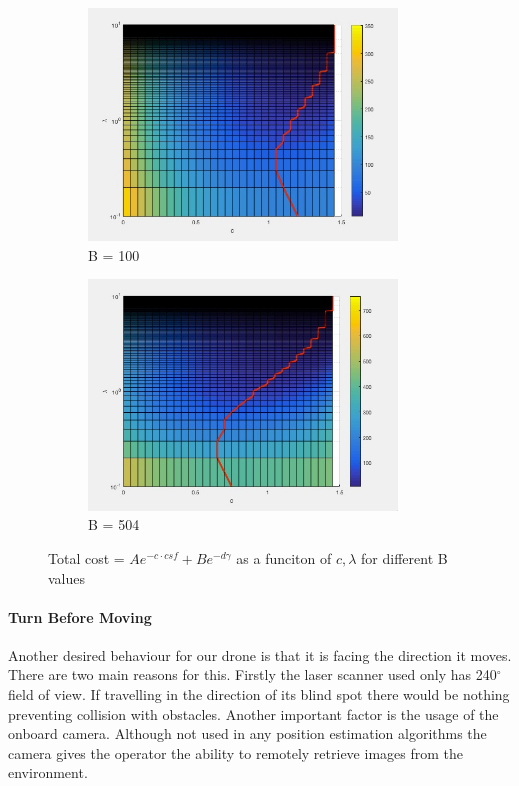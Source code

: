 \documentclass[capstone_report.tex]{subfiles}
\begin{document}
\begin{figure}[H]
    \centering
    \begin{subfigure}{0.5\textwidth}
        \centering
        \includegraphics[width=0.9\textwidth]{imgs/obstacle_vs_goal_B_100.jpg}
        \caption{B = 100}
    \end{subfigure}%
    \begin{subfigure}{0.5\textwidth}
        \centering
        \includegraphics[width=0.9\textwidth]{imgs/obstacle_vs_goal_B_504.jpg}
        \caption{B = 504}
    \end{subfigure}
    \caption{Total cost = $Ae^{-c\cdot csf} + Be^{-d\gamma}$ as a funciton of $c, \lambda$ for different B values}\label{fig:ocf_total_cost}
\end{figure}


\paragraph{Turn Before Moving}
Another desired behaviour for our drone is that it is facing the direction it moves.  There are two main reasons for this.  Firstly the laser scanner used only has 240$^\circ$ field of view.  If travelling in the direction of its blind spot there would be nothing preventing collision with obstacles.  Another important factor is the usage of the onboard camera.  Although not used in any position estimation algorithms the camera gives the operator the ability to remotely retrieve images from the environment.\\
\end{document}
